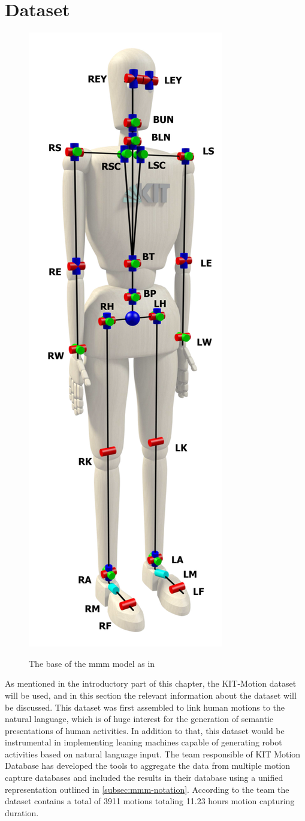 \section{Dataset}
\begin{figure}
	\vspace{-1.5cm}
	\begin{center}
		\includegraphics[width=.25\textwidth]{img/mmm-model.png}
		\label{fig:mmm-model}
		\caption{The base of the mmm model as in \cite{Plappert2016}}
	\end{center}
\end{figure}
As mentioned in the introductory part of this chapter, the KIT-Motion dataset\cite{Plappert2016} will be used, and in this section the relevant information about the dataset will be discussed. This dataset was first assembled to link human motions to the natural language, which is of huge interest for the generation of semantic presentations of human activities. In addition to that, this dataset would be instrumental in implementing leaning machines capable of generating robot activities based on natural language input\cite{Plappert2016}. The team responsible of KIT Motion Database has developed the tools to aggregate the data from multiple motion capture databases and included the results in their database using a unified representation outlined in \ref{subsec:mmm-notation}. According to the team the dataset contains a total of 3911 motions totaling 11.23 hours motion capturing duration\cite{Plappert2016}.
